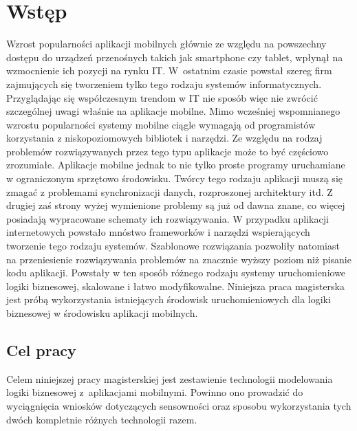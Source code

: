 \chapter{Wstęp}
\label{cha:wstep}

Wzrost popularności aplikacji mobilnych głównie ze względu na powszechny dostępu do urządzeń przenośnych takich jak smartphone czy tablet, wpłynął na wzmocnienie ich pozycji na rynku IT. W~ostatnim czasie powstał szereg firm zajmujących się tworzeniem tylko tego rodzaju systemów informatycznych. Przyglądając się współczesnym trendom w IT nie sposób więc nie zwrócić szczególnej uwagi  właśnie na aplikacje mobilne. Mimo wcześniej wspomnianego wzrostu popularności systemy mobilne ciągle wymagają od programistów korzystania z niskopoziomowych bibliotek i narzędzi. Ze względu na rodzaj problemów rozwiązywanych przez tego typu aplikacje może to być częściowo zrozumiałe. Aplikacje mobilne jednak to nie tylko proste programy uruchamiane w ograniczonym sprzętowo środowisku. Twórcy tego rodzaju aplikacji muszą się zmagać z problemami synchronizacji danych, rozproszonej architektury  itd. 
Z drugiej zaś strony wyżej wymienione problemy są już od dawna znane, co więcej posiadają wypracowane schematy ich rozwiązywania. W przypadku aplikacji internetowych powstało mnóstwo frameworków i narzędzi wspierających tworzenie tego rodzaju systemów. Szablonowe rozwiązania pozwoliły natomiast na przeniesienie rozwiązywania problemów na znacznie wyższy poziom niż pisanie kodu aplikacji. Powstały w ten sposób różnego rodzaju systemy uruchomieniowe logiki biznesowej, skalowane i łatwo modyfikowalne. 
Niniejsza praca magisterska jest próbą wykorzystania istniejących środowisk uruchomieniowych dla logiki biznesowej w środowisku aplikacji mobilnych. 


\section{Cel pracy}
\label{sec:celePracy}

Celem niniejszej pracy magisterskiej jest zestawienie technologii  modelowania logiki biznesowej z~aplikacjami mobilnymi. Powinno ono prowadzić do wyciągnięcia wniosków dotyczących sensowności oraz sposobu wykorzystania tych dwóch kompletnie różnych technologii razem. 


